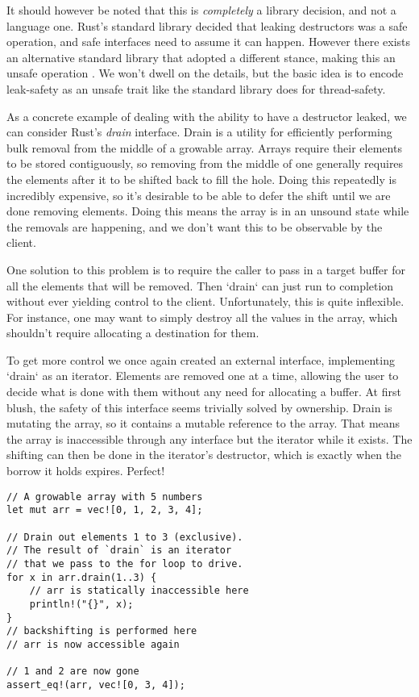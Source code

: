 It should however be noted that this is \emph{completely} a library decision,
and not a language one. Rust's standard library decided that leaking destructors
was a safe operation, and safe interfaces need to assume it can happen. However
there exists an alternative standard library that adopted a different stance,
making this an unsafe operation \cite{rust-fork}. We won't dwell on the details,
but the basic idea is to encode leak-safety as an unsafe trait like the standard
library does for thread-safety.

As a concrete example of dealing with the ability to have a destructor leaked,
we can consider Rust's \emph{drain} interface. Drain is a
utility for efficiently performing bulk removal from the middle of a growable
array. Arrays require their elements to be stored contiguously, so removing
from the middle of one generally requires the elements after it to be
shifted back to fill the hole. Doing this repeatedly is incredibly expensive,
so it's desirable to be able to defer the shift until we are done removing
elements. Doing this means the array is in an unsound state while the
removals are happening, and we don't want this to be observable by the client.

One solution to this problem is to require the caller to pass in a
target buffer for all the elements that will be removed. Then `drain` can
just run to completion without ever yielding control to the client. Unfortunately,
this is quite inflexible. For instance, one may want to simply destroy all the
values in the array, which shouldn't require allocating a destination for them.

To get more control we once again created an external interface, implementing
`drain` as an iterator. Elements are removed one at a time, allowing the user to
decide what is done with them without any need for allocating a buffer. At first
blush, the safety of this interface seems trivially solved by ownership. Drain is mutating the
array, so it contains a mutable reference to the array. That means the array is
inaccessible through any interface but the iterator while it exists. The
shifting can then be done in the iterator's destructor, which is exactly when
the borrow it holds expires. Perfect!

\begin{verbatim}
// A growable array with 5 numbers
let mut arr = vec![0, 1, 2, 3, 4];

// Drain out elements 1 to 3 (exclusive).
// The result of `drain` is an iterator
// that we pass to the for loop to drive.
for x in arr.drain(1..3) {
    // arr is statically inaccessible here
    println!("{}", x);
}
// backshifting is performed here
// arr is now accessible again

// 1 and 2 are now gone
assert_eq!(arr, vec![0, 3, 4]);
\end{verbatim}

